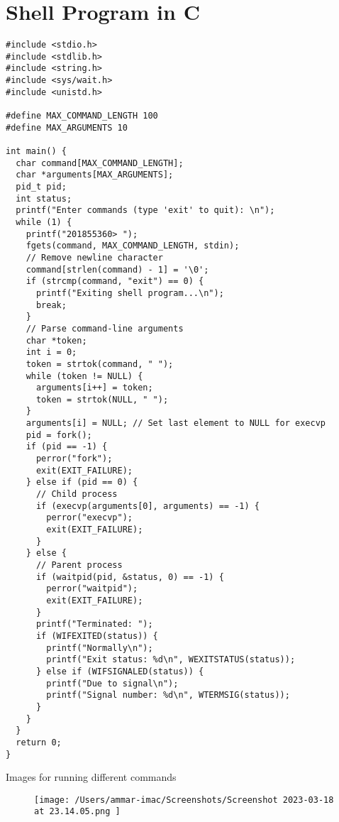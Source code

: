 \documentclass{article}
\begin{document}
\newpage
\section{Shell Program in C}%
\begin{verbatim}
#include <stdio.h>
#include <stdlib.h>
#include <string.h>
#include <sys/wait.h>
#include <unistd.h>

#define MAX_COMMAND_LENGTH 100
#define MAX_ARGUMENTS 10

int main() {
  char command[MAX_COMMAND_LENGTH];
  char *arguments[MAX_ARGUMENTS];
  pid_t pid;
  int status;
  printf("Enter commands (type 'exit' to quit): \n");
  while (1) {
    printf("201855360> ");
    fgets(command, MAX_COMMAND_LENGTH, stdin);
    // Remove newline character
    command[strlen(command) - 1] = '\0';
    if (strcmp(command, "exit") == 0) {
      printf("Exiting shell program...\n");
      break;
    }
    // Parse command-line arguments
    char *token;
    int i = 0;
    token = strtok(command, " ");
    while (token != NULL) {
      arguments[i++] = token;
      token = strtok(NULL, " ");
    }
    arguments[i] = NULL; // Set last element to NULL for execvp
    pid = fork();
    if (pid == -1) {
      perror("fork");
      exit(EXIT_FAILURE);
    } else if (pid == 0) {
      // Child process
      if (execvp(arguments[0], arguments) == -1) {
        perror("execvp");
        exit(EXIT_FAILURE);
      }
    } else {
      // Parent process
      if (waitpid(pid, &status, 0) == -1) {
        perror("waitpid");
        exit(EXIT_FAILURE);
      }
      printf("Terminated: ");
      if (WIFEXITED(status)) {
        printf("Normally\n");
        printf("Exit status: %d\n", WEXITSTATUS(status));
      } else if (WIFSIGNALED(status)) {
        printf("Due to signal\n");
        printf("Signal number: %d\n", WTERMSIG(status));
      }
    }
  }
  return 0;
}
\end{verbatim}


Images for running different commands

\begin{figure}[ht]
	\centering
	\texttt{[image: /Users/ammar-imac/Screenshots/Screenshot 2023-03-18 at 23.14.05.png ]}
\end{figure}
\end{document}
